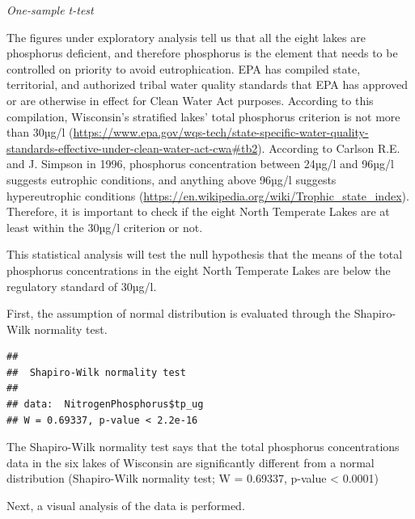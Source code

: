 \documentclass[12pt,]{article}
\newenvironment{Shaded}{\begin{snugshade}}{\end{snugshade}}
\newcommand{\CommentTok}[1]{\textcolor[rgb]{0.56,0.35,0.01}{\textit{#1}}}
\newcommand{\DataTypeTok}[1]{\textcolor[rgb]{0.13,0.29,0.53}{#1}}
\newcommand{\DecValTok}[1]{\textcolor[rgb]{0.00,0.00,0.81}{#1}}
\newcommand{\KeywordTok}[1]{\textcolor[rgb]{0.13,0.29,0.53}{\textbf{#1}}}
\newcommand{\NormalTok}[1]{#1}
\newcommand{\OperatorTok}[1]{\textcolor[rgb]{0.81,0.36,0.00}{\textbf{#1}}}
\begin{document}
\emph{One-sample t-test}

The figures under exploratory analysis tell us that all the eight lakes
are phosphorus deficient, and therefore phosphorus is the element that
needs to be controlled on priority to avoid eutrophication. EPA has
compiled state, territorial, and authorized tribal water quality
standards that EPA has approved or are otherwise in effect for Clean
Water Act purposes. According to this compilation, Wisconsin's
stratified lakes' total phosphorus criterion is not more than 30µg/l
(\url{https://www.epa.gov/wqs-tech/state-specific-water-quality-standards-effective-under-clean-water-act-cwa\#tb2}).
According to Carlson R.E. and J. Simpson in 1996, phosphorus
concentration between 24µg/l and 96µg/l suggests eutrophic conditions,
and anything above 96µg/l suggests hypereutrophic conditions
(\url{https://en.wikipedia.org/wiki/Trophic_state_index}). Therefore, it
is important to check if the eight North Temperate Lakes are at least
within the 30µg/l criterion or not.

This statistical analysis will test the null hypothesis that the means
of the total phosphorus concentrations in the eight North Temperate
Lakes are below the regulatory standard of 30µg/l.

First, the assumption of normal distribution is evaluated through the
Shapiro-Wilk normality test.

\begin{Shaded}
\end{Shaded}

\begin{verbatim}
## 
##  Shapiro-Wilk normality test
## 
## data:  NitrogenPhosphorus$tp_ug
## W = 0.69337, p-value < 2.2e-16
\end{verbatim}

The Shapiro-Wilk normality test says that the total phosphorus
concentrations data in the six lakes of Wisconsin are significantly
different from a normal distribution (Shapiro-Wilk normality test; W =
0.69337, p-value \textless{} 0.0001)

Next, a visual analysis of the data is performed.

\begin{Shaded}
\end{Shaded}
\end{document}
